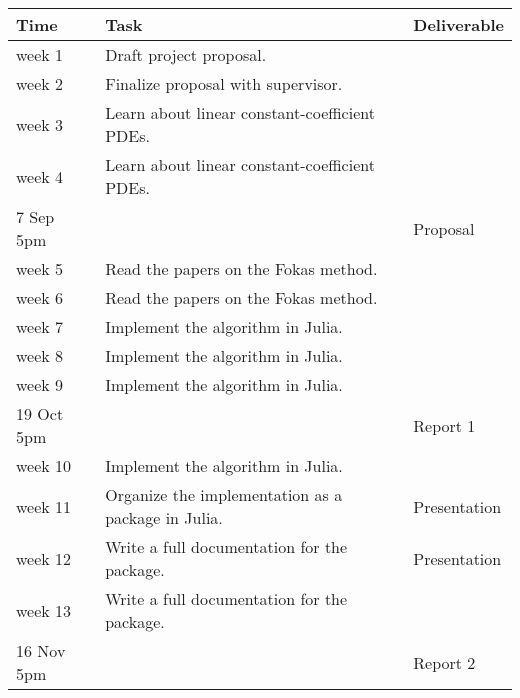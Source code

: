\documentclass[11pt, oneside, a4paper]{article}
\begin{document}
\begin{center}
    \begin{tabular}{|l|l|l|} 
        \hline
        Time & Task & Deliverable\\
        \hline
        week 1 & Draft project proposal. & \\ 
        \hline
        week 2 & Finalize proposal with supervisor.& \\ 
        \hline
        week 3 & Learn about linear constant-coefficient PDEs.&\\
        \hline
        week 4 & Learn about linear constant-coefficient PDEs.&\\
        \hline 
        7 Sep 5pm & & Proposal\\
        \hline
        week 5 & Read the papers on the Fokas method.&\\
        \hline
        week 6 & Read the papers on the Fokas method.&\\
        \hline
        week 7 & Implement the algorithm in Julia.&\\
        \hline
        week 8 & Implement the algorithm in Julia.&\\
        \hline
        week 9 & Implement the algorithm in Julia.&\\
        \hline
        19 Oct 5pm & & Report 1\\
        \hline
        week 10 & Implement the algorithm in Julia.&\\
        \hline
        week 11 & Organize the implementation as a package in Julia.& Presentation\\
        \hline
        week 12 & Write a full documentation for the package.& Presentation\\
        \hline
        week 13 & Write a full documentation for the package.&\\
        \hline
        16 Nov 5pm & & Report 2\\
        \hline
    \end{tabular}

\end{center}
\end{document}
